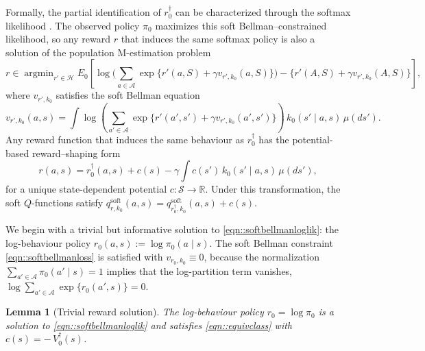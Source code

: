 \documentclass[12pt]{article}
\DeclareMathOperator*{\argmin}{argmin}
\theoremstyle{plain}
\newtheorem{lemma}[theorem]{Lemma}
\begin{document}
Formally, the partial identification of \(r_0^\dagger\) can be characterized
through the softmax likelihood \citep{rust1987optimal,ziebart2008maximum}.  The
observed policy \(\pi_0\) maximizes this soft Bellman--constrained likelihood,
so any reward \(r\) that induces the same softmax policy is also a solution of
the population M-estimation problem
\begin{equation}
\label{eqn::softbellmanloglik}
r \in \argmin_{r' \in \mathcal{H}} 
E_0\!\left[
  \log\!\Bigg(\sum_{a \in \mathcal{A}}
    \exp\{ r'(a,S) + \gamma v_{r',k_0}(a,S) \}\Bigg)
  - \{ r'(A,S) + \gamma v_{r',k_0}(A,S) \}
\right],
\end{equation}
where \(v_{r',k_0}\) satisfies the soft Bellman equation
\begin{equation}
v_{r',k_0}(a,s) 
= \int \log\!\left(\sum_{a' \in \mathcal{A}}
   \exp\!\big\{ r'(a',s') + \gamma v_{r',k_0}(a',s') \big\}\right)
\, k_0(s' \mid a,s)\,\mu(ds').
\label{eqn::softbellmanloss}
\end{equation}
Any reward function that induces the same behaviour as \(r_0^\dagger\) has the
potential-based reward--shaping form
\citep{ng1999policy,fu2018airl,geng2020deep}
\begin{equation}
r(a,s)
= r_0^\dagger(a,s)
  + c(s)
  - \gamma \int c(s')\, k_0(s' \mid a,s)\,\mu(ds'),
\label{eqn::equivclass}
\end{equation}
for a unique state-dependent potential \(c : \mathcal{S} \to \mathbb{R}\).  
Under this transformation, the soft \(Q\)-functions satisfy
\(q_{r,k_0}^{\mathrm{soft}}(a,s) 
 = q_{r_0^\dagger,k_0}^{\mathrm{soft}}(a,s) + c(s)\).

 

We begin with a trivial but informative solution to
\eqref{eqn::softbellmanloglik}: the log-behaviour policy
\(r_0(a,s) := \log \pi_0(a \mid s)\).  The soft Bellman constraint
\eqref{eqn::softbellmanloss} is satisfied with \(v_{r_0,k_0} \equiv 0\),
because the normalization \(\sum_{a' \in \mathcal{A}} \pi_0(a' \mid s) = 1\)
implies that the log-partition term vanishes,
\(\log \sum_{a' \in \mathcal{A}} \exp\{r_0(a',s)\} = 0\). 

\begin{lemma}[Trivial reward solution]
\label{theorem::trivialsol}
The log-behaviour policy \(r_0 = \log \pi_0\) is a solution to
\eqref{eqn::softbellmanloglik} and satisfies \eqref{eqn::equivclass} with
\(c(s) = -\,V_0^\dagger(s)\).
\end{lemma}
 
\end{document}
